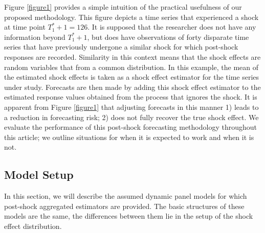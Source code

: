 \documentclass[11pt]{article}
\theoremstyle{definition}
\begin{document}
Figure \ref{figure1} provides a simple intuition of the practical usefulness of our proposed methodology. This figure depicts a time series that experienced a shock at time point $T_1^*+1 = 126$. It is supposed that the researcher does not have any information beyond $T_1^*+1$, but does have observations of forty disparate time series that have previously undergone a similar shock for which post-shock responses are recorded. Similarity in this context means that the shock effects are random variables that from a common distribution.
In this example, the mean of the estimated shock effects is taken as a shock effect estimator for the time series under study. Forecasts are then made by adding this shock effect estimator to the estimated response values obtained from the process that ignores the shock. It is apparent from Figure \ref{figure1} that adjusting forecasts in this manner 1) leads to a reduction in forecasting risk; 2) does not fully recover the true shock effect. We evaluate the performance of this post-shock forecasting methodology throughout this article; we outline situations for when it is expected to work and when it is not.







\subsection{Model Setup}

\label{modelsetup}

In this section, we will describe the assumed dynamic panel models for which 
post-shock aggregated estimators are provided. The basic structures of these models 
are the same, the differences between them lie in the setup of the shock effect 
distribution.
\end{document}
